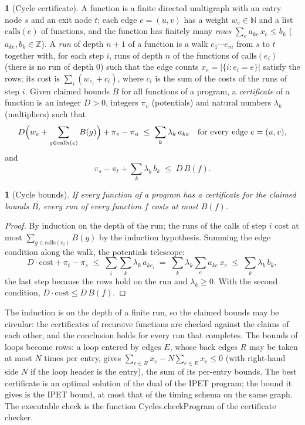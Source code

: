 \documentclass[oneside,english]{amsart}
\numberwithin{equation}{section}
\theoremstyle{plain}
\theoremstyle{definition}
\newtheorem{defn}[thm]{\protect\definitionname}
\theoremstyle{plain}
\newtheorem{prop}[thm]{\protect\propositionname}
\theoremstyle{plain}
\theoremstyle{remark}
\newcommand{\lean}[1]{{\ttfamily\small #1}}
\providecommand{\definitionname}{Definition}
\providecommand{\propositionname}{Proposition}
\begin{document}
\begin{defn}[Cycle certificate]
\label{def:cycle-certificate}
A function is a finite directed multigraph with an entry node $s$ and an exit node $t$; each edge $e = (u, v)$ has a weight $w_e \in \mathbb{N}$ and a list $\mathrm{calls}(e)$ of functions, and the function has finitely many \emph{rows} $\sum_e a_{ke}\, x_e \le b_k$ ($a_{ke}, b_k \in \mathbb{Z}$). A \emph{run} of depth $n + 1$ of a function is a walk $e_1 \cdots e_m$ from $s$ to $t$ together with, for each step $i$, runs of depth $n$ of the functions of $\mathrm{calls}(e_i)$ (there is no run of depth 0) such that the edge counts $x_e = |\{i : e_i = e\}|$ satisfy the rows; its cost is $\sum_i (w_{e_i} + c_i)$, where $c_i$ is the sum of the costs of the runs of step $i$. Given claimed bounds $B$ for all functions of a program, a \emph{certificate} of a function is an integer $D > 0$, integers $\pi_v$ (potentials) and natural numbers $\lambda_k$ (multipliers) such that
\[
  D\Bigl(w_e + \sum_{g \in \mathrm{calls}(e)} B(g)\Bigr) + \pi_v - \pi_u \;\le\; \sum_k \lambda_k\, a_{ke} \quad \text{for every edge } e = (u, v),
\]
and
\[
  \pi_s - \pi_t + \sum_k \lambda_k\, b_k \;\le\; D\, B(f).
\]
\end{defn}

\begin{prop}[Cycle bounds]
\label{prop:cycles}
If every function of a program has a certificate for the claimed bounds $B$, every run of every function $f$ costs at most $B(f)$.
\end{prop}

\begin{proof}
By induction on the depth of the run; the runs of the calls of step $i$ cost at most $\sum_{g \in \mathrm{calls}(e_i)} B(g)$ by the induction hypothesis. Summing the edge condition along the walk, the potentials telescope:
\[
  D \cdot \mathrm{cost} + \pi_t - \pi_s \;\le\; \sum_i \sum_k \lambda_k\, a_{k e_i} \;=\; \sum_k \lambda_k \sum_e a_{ke}\, x_e \;\le\; \sum_k \lambda_k\, b_k,
\]
the last step because the rows hold on the run and $\lambda_k \ge 0$. With the second condition, $D \cdot \mathrm{cost} \le D\, B(f)$.
\end{proof}

The induction is on the depth of a finite run, so the claimed bounds may be circular: the certificates of recursive functions are checked against the claims of each other, and the conclusion holds for every run that completes. The bounds of loops become rows: a loop entered by edges $E$, whose back edges $R$ may be taken at most $N$ times per entry, gives $\sum_{e \in R} x_e - N \sum_{e \in E} x_e \le 0$ (with right-hand side $N$ if the loop header is the entry), the sum of its per-entry bounds. The best certificate is an optimal solution of the dual of the IPET program; the bound it gives is the IPET bound, at most that of the timing schema \cite{puschner1989calculating} on the same graph. The executable check is the function \lean{Cycles.\allowbreak checkProgram} of the certificate checker.
\end{document}
